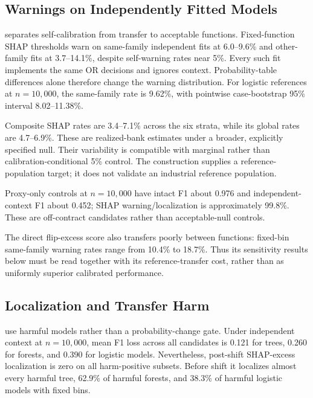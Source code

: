 \documentclass[conference]{IEEEtran}
\begin{document}
\subsection{Warnings on Independently Fitted Models}
 separates self-calibration from transfer to acceptable functions. Fixed-function SHAP thresholds warn on same-family independent fits at 6.0--9.6\% and other-family fits at 3.7--14.1\%, despite self-warning rates near 5\%. Every such fit implements the same OR decisions and ignores context. Probability-table differences alone therefore change the warning distribution. For logistic references at $n=10{,}000$, the same-family rate is 9.62\%, with pointwise case-bootstrap 95\% interval 8.02--11.38\%.

\begin{table}[t]
\centering
\caption{SHAP warning frequency (\%) with fixed overlap bins. Fixed-function columns use one $f$ for calibration. Independent controls are decision-equivalent mechanism-only fits; the cross-family column spans the two other families. Composite calibration uses one batch per independent same-family fit. Each evaluated stratum has 200 models and 200 test batches per model.}
\label{tab:transfer-warning}
\footnotesize

\end{table}

Composite SHAP rates are 3.4--7.1\% across the six strata, while its global rates are 4.7--6.9\%. These are realized-bank estimates under a broader, explicitly specified null. Their variability is compatible with marginal rather than calibration-conditional 5\% control. The construction supplies a reference-population target; it does not validate an industrial reference population.

Proxy-only controls at $n=10{,}000$ have intact F1 about 0.976 and independent-context F1 about 0.452; SHAP warning/localization is approximately 99.8\%. These are off-contract candidates rather than acceptable-null controls.

The direct flip-excess score also transfers poorly between functions: fixed-bin same-family warning rates range from 10.4\% to 18.7\%. Thus its sensitivity results below must be read together with its reference-transfer cost, rather than as uniformly superior calibrated performance.

\subsection{Localization and Transfer Harm}
 use harmful models rather than a probability-change gate. Under independent context at $n=10{,}000$, mean F1 loss across all candidates is 0.121 for trees, 0.260 for forests, and 0.390 for logistic models. Nevertheless, post-shift SHAP-excess localization is zero on all harm-positive subsets. Before shift it localizes almost every harmful tree, 62.9\% of harmful forests, and 38.3\% of harmful logistic models with fixed bins.
\end{document}
